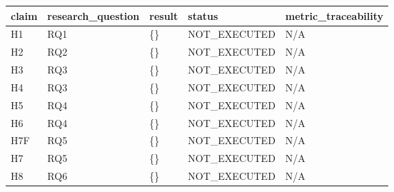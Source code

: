 \begin{tabular}{lllll}
\hline
claim & research\_question & result & status & metric\_traceability \\
\hline
H1 & RQ1 & \{\} & NOT\_EXECUTED & N/A \\
H2 & RQ2 & \{\} & NOT\_EXECUTED & N/A \\
H3 & RQ3 & \{\} & NOT\_EXECUTED & N/A \\
H4 & RQ3 & \{\} & NOT\_EXECUTED & N/A \\
H5 & RQ4 & \{\} & NOT\_EXECUTED & N/A \\
H6 & RQ4 & \{\} & NOT\_EXECUTED & N/A \\
H7F & RQ5 & \{\} & NOT\_EXECUTED & N/A \\
H7 & RQ5 & \{\} & NOT\_EXECUTED & N/A \\
H8 & RQ6 & \{\} & NOT\_EXECUTED & N/A \\
\hline
\end{tabular}
